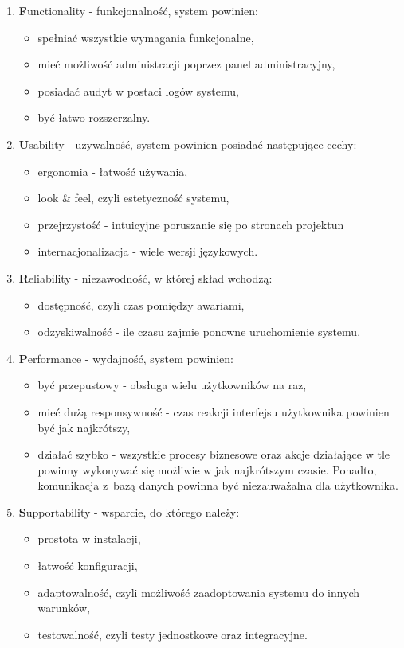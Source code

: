 \begin{enumerate}
	\item \textbf{F}unctionality - funkcjonalność, system powinien:
		\begin{itemize}
			\item spełniać wszystkie wymagania funkcjonalne,
			\item mieć możliwość administracji poprzez panel administracyjny,
			\item posiadać audyt w postaci logów systemu,
			\item być łatwo rozszerzalny.
		\end{itemize}
	\item \textbf{U}sability - używalność, system powinien posiadać następujące cechy:
		\begin{itemize}
			\item ergonomia - łatwość używania,
			\item look \& feel, czyli estetyczność systemu,
			\item przejrzystość - intuicyjne poruszanie się po stronach projektun
			\item internacjonalizacja - wiele wersji językowych.
		\end{itemize}
	\item \textbf{R}eliability - niezawodność, w której skład wchodzą:
		\begin{itemize}
			\item dostępność, czyli czas pomiędzy awariami,
			\item odzyskiwalność - ile czasu zajmie ponowne uruchomienie systemu.
		\end{itemize}
	\item \textbf{P}erformance - wydajność, system powinien:
		\begin{itemize}
			\item być przepustowy - obsługa wielu użytkowników na raz,
			\item mieć dużą responsywność - czas reakcji interfejsu użytkownika powinien być jak najkrótszy,
			\item działać szybko - wszystkie procesy biznesowe oraz akcje działające w tle powinny wykonywać się możliwie w jak najkrótszym czasie. Ponadto, komunikacja z~bazą danych powinna być niezauważalna dla użytkownika.
		\end{itemize}
	\item \textbf{S}upportability - wsparcie, do którego należy:
		\begin{itemize}
			\item prostota w instalacji,
			\item łatwość konfiguracji,
			\item adaptowalność, czyli możliwość zaadoptowania systemu do innych warunków,
			\item testowalność, czyli testy jednostkowe oraz integracyjne.
		\end{itemize}
\end{enumerate}

